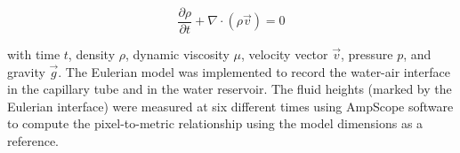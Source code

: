 \documentclass{article}
\begin{document}
\begin{dmath}
\frac{\partial \rho}{\partial t} + \nabla \cdot (\rho \vec{v}) = 0
\end{dmath}

with time $t$, density $\rho$, dynamic viscosity $\mu$, velocity vector $\vec{v}$, pressure $p$, and gravity $\vec{g}$. The Eulerian model was implemented to record the water-air interface in the capillary tube and in the water reservoir. The fluid heights (marked by the Eulerian interface) were measured at six different times using AmpScope software to compute the pixel-to-metric relationship using the model dimensions as a reference.



\printbibliography[title={References}]
\end{document}
